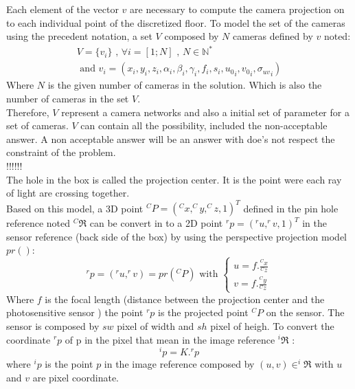 Each element of the vector $v$ are necessary to compute the camera projection on to each individual point of the discretized floor. 
\iffalse 
To model the set of the cameras using the precedent notation, a set $V$ composed by $N$ cameras defined by $v$ noted:
\begin{equation}\label{eq:V}
\begin{split}
V= \{v_i\} \mbox{  , } \forall i=[1;N] \mbox{ , } N\in \mathbb{N}^*
\\
\mbox{ and } v_i= (x_i,y_i,z_i,\alpha_i ,\beta_i,\gamma_i,f_i,s_i,{u_0}_i,{v_0}_i,{\sigma_{uv}}_i)
\end{split}
\end{equation}
\noindent Where $N$ is the given number of cameras in the solution. Which is also the number of cameras in the set $V$. \\
Therefore, $V$ represent a camera networks and also a initial set of parameter for a set of cameras. $V$ can contain all the possibility, included the non-acceptable answer. A non acceptable  answer will be an answer with  doe's not respect the constraint of the problem.   
 \\ !!!!!!\\

  
 
    
The hole in the box is called the projection center. It is the point were each ray of light are crossing together.  \\
Based on this model, a 3D point $^CP=(^Cx,^Cy,^Cz,1)^T$ defined in the pin hole reference noted $ ^C\Re$ can be convert in to a 2D point  $^rp=(^ru,^rv,1)^T$ in the sensor reference (back side of the box) by using  the perspective projection model $pr() $: 
\begin{equation}
^rp=(^ru,^rv)= pr(^CP) \mbox{ with } \begin{cases} u= f.\frac{^Cx}{^Cz} \\  v= f.\frac{^Cy}{^Cz} 
\end{cases} 
\end{equation}
Where $f$ is the focal length (distance between the projection center and the photosensitive sensor )
the point $^rp$ is the projected point $^CP$ on the sensor. The sensor is composed by $sw$ pixel of width and $sh$  pixel of  heigh. To convert the coordinate $^rp$ of p in the pixel  that mean in the image reference $^i\Re$ : 
\begin{equation}
^ip=K. ^rp
\end{equation}
where $^ip$  is the point $p$ in the image reference composed by $(u,v) \in ^i\Re$ with $u$ and $v$ are  pixel coordinate. 


